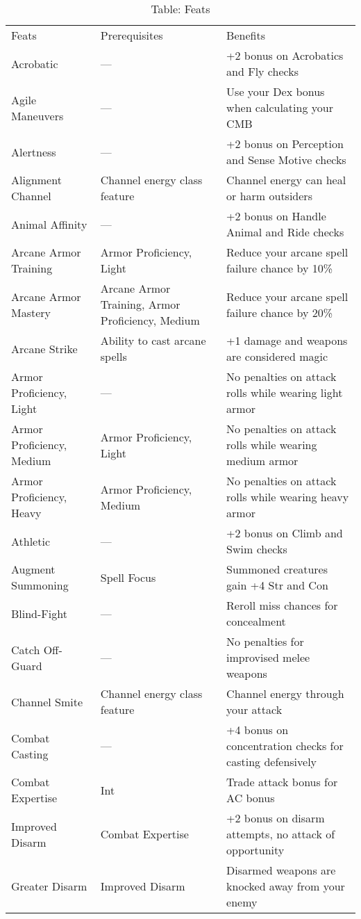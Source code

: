 \begin{table*}[]
\sffamily
\caption{Table: Feats}
\begin{tabularx}{\linewidth}{lXl}
Feats & Prerequisites & Benefits\\
Acrobatic & --- & +2 bonus on Acrobatics and Fly checks \\
Agile Maneuvers & --- & Use your Dex bonus when calculating your CMB \\
Alertness & --- & +2 bonus on Perception and Sense Motive checks\\
Alignment Channel & Channel energy class feature & Channel energy can heal or harm outsiders\\
Animal Affinity & --- & +2 bonus on Handle Animal and Ride checks\\
Arcane Armor Training & Armor Proficiency, Light & Reduce your arcane spell failure chance by 10\%\\
\quad Arcane Armor Mastery & Arcane Armor Training, Armor Proficiency, Medium & Reduce your arcane spell failure chance by 20\%\\
Arcane Strike & Ability to cast arcane spells & +1 damage and weapons are considered magic\\
Armor Proficiency, Light & --- & No penalties on attack rolls while wearing light armor\\
\quad Armor Proficiency, Medium & Armor Proficiency, Light & No penalties on attack rolls while wearing medium armor\\
\quad \quad Armor Proficiency, Heavy & Armor Proficiency, Medium & No penalties on attack rolls while wearing heavy armor\\
Athletic & --- & +2 bonus on Climb and Swim checks\\
Augment Summoning & Spell Focus & Summoned creatures gain +4 Str and Con\\
Blind-Fight & --- & Reroll miss chances for concealment\\
Catch Off-Guard & --- & No penalties for improvised melee weapons\\
Channel Smite & Channel energy class feature & Channel energy through your attack\\
Combat Casting & --- & +4 bonus on concentration checks for casting defensively\\
Combat Expertise & Int & Trade attack bonus for AC bonus\\
\quad Improved Disarm & Combat Expertise & +2 bonus on disarm attempts, no attack of opportunity\\
\quad \quad Greater Disarm & Improved Disarm & Disarmed weapons are knocked away from your enemy\\

\end{tabularx}
\end{table*}
